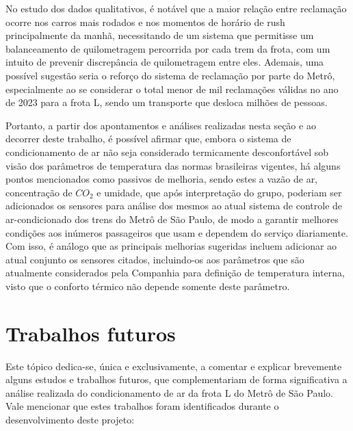 \documentclass[acronym,symbols,table]{fei}
\begin{document}
No estudo dos dados qualitativos, é notável que a maior relação entre reclamação ocorre nos carros mais rodados e nos momentos de horário de rush principalmente da manhã, necessitando de um sistema que permitisse um balanceamento de quilometragem percorrida por cada trem da frota, com um intuito de prevenir discrepância de quilometragem entre eles. Ademais, uma possível sugestão seria o reforço do sistema de reclamação por parte do Metrô, especialmente ao se considerar o total menor de mil reclamações válidas no ano de 2023 para a frota L, sendo um transporte que desloca milhões de pessoas.

Portanto, a partir dos apontamentos e análises realizadas nesta seção e ao decorrer deste trabalho, é possível afirmar que, embora o sistema de condicionamento de ar não seja considerado termicamente desconfortável sob visão dos parâmetros de temperatura das normas brasileiras vigentes, há alguns pontos mencionados como passivos de melhoria, sendo estes a vazão de ar, concentração de ${CO}_{2}$ e umidade, que após interpretação do grupo, poderiam ser adicionados os sensores para análise dos mesmos ao atual sistema de controle de ar-condicionado dos trens do Metrô de São Paulo, de modo a garantir melhores condições aos inúmeros passageiros que usam e dependem do serviço diariamente. Com isso, é análogo que as principais melhorias sugeridas incluem adicionar ao atual conjunto os sensores citados, incluindo-os aos parâmetros que são atualmente considerados pela Companhia para definição de temperatura interna, visto que o conforto térmico não depende somente deste parâmetro.

\chapter{Trabalhos futuros}

Este tópico dedica-se, única e exclusivamente, a comentar e explicar brevemente alguns estudos e trabalhos futuros, que complementariam de forma significativa a análise realizada do condicionamento de ar da frota L do Metrô de São Paulo. Vale mencionar que estes trabalhos foram identificados durante o desenvolvimento deste projeto:
\end{document}
